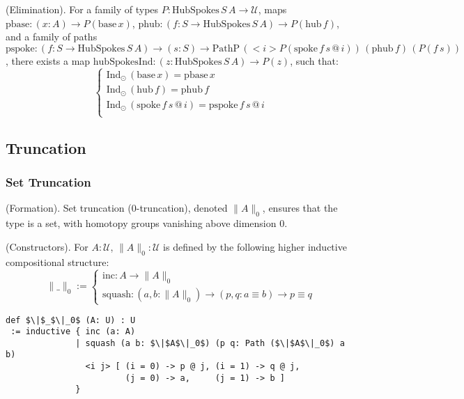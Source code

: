 \begin{theorem} (Elimination).
For a family of types \( P : \text{HubSpokes} \, S \, A \to \mathcal{U} \),
maps \( \text{pbase} : (x : A) \to P(\text{base} \, x) \),
\( \text{phub} : (f : S \to \text{HubSpokes} \, S \, A) \to P(\text{hub} \, f) \),
and a family of paths
\( \text{pspoke} : (f : S \to \text{HubSpokes} \, S \, A) \to (s : S) \to \text{PathP} \, (<i> P(\text{spoke} \, f \, s \, @ \, i)) \, (\text{phub} \, f) \, (P(f \, s)) \),
there exists a map \( \text{hubSpokesInd} : (z : \text{HubSpokes} \, S \, A) \to P(z) \), such that:
\[
\begin{cases}
\text{Ind}_\odot \, (\text{base} \, x) = \text{pbase} \, x \\
\text{Ind}_\odot \, (\text{hub} \, f) = \text{phub} \, f \\
\text{Ind}_\odot \, (\text{spoke} \, f \, s \, @ \, i) = \text{pspoke} \, f \, s \, @ \, i \\
\end{cases}
\]
\end{theorem}

\newpage
\subsection{Truncation}
\subsubsection*{Set Truncation}
\begin{definition} (Formation).
Set truncation (0-truncation), denoted \( \| A \|_0 \),
ensures that the type is a set, with homotopy groups vanishing above dimension 0.
\end{definition}

\begin{definition} (Constructors).
For \( A : \mathcal{U} \), \( \| A \|_0 : \mathcal{U} \) is defined by the following higher
inductive compositional structure:
\[
\| \_ \|_0 :=
\begin{cases}
\text{inc} : A \to \| A \|_0 \\
\text{squash} : (a, b : \| A \|_0) \to (p, q : a \equiv b) \to p \equiv q
\end{cases}
\]
\begin{lstlisting}[mathescape=true]
def $\|$_$\|_0$ (A: U) : U
 := inductive { inc (a: A)
              | squash (a b: $\|$A$\|_0$) (p q: Path ($\|$A$\|_0$) a b)
                <i j> [ (i = 0) -> p @ j, (i = 1) -> q @ j,
                        (j = 0) -> a,     (j = 1) -> b ]
              }
\end{lstlisting}
\end{definition}

